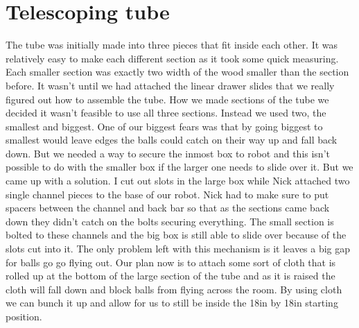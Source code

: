 \section*{Telescoping tube}
The tube was initially made into three pieces that fit inside each other. It was relatively easy to make each different section as it took some quick measuring. Each smaller section was exactly two width of the wood smaller than the section before. It wasn’t until we had attached the linear drawer slides that we really figured out how to assemble the tube. How we made sections of the tube we decided it wasn’t feasible to use all three sections. Instead we used two, the smallest and biggest. One of our biggest fears was that by going biggest to smallest would leave edges the balls could catch on their way up and fall back down. But we needed a way to secure the inmost box to robot and this isn’t possible to do with the smaller box if the larger one needs to slide over it. But we came up with a solution. I cut out slots in the large box while Nick attached two single channel pieces to the base of our robot. Nick had to make sure to put spacers between the channel and back bar so that as the sections came back down they didn’t catch on the bolts securing everything. The small section is bolted to these channels and the big box is still able to slide over because of the slots cut into it. The only problem left with this mechanism is it leaves a big gap for balls go go flying out. Our plan now is to attach some sort of cloth that is rolled up at the bottom of the large section of the tube and as it is raised the cloth will fall down and block balls from flying across the room. By using cloth we can bunch it up and allow for us to still be inside the 18in by 18in starting position. 

